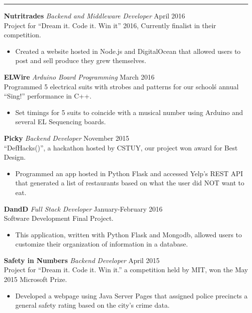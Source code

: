 \documentclass[14, .75in]{article}
\begin{document}
  \vspace{0.1cm} \hrule \vspace{0.2cm}
  \noindent\textbf{Nutritrades}\textit{ Backend and Middleware Developer} \hfill April 2016\\
  Project for ``Dream it. Code it. Win it'' 2016, Currently finalist in their competition.
  \begin{itemize}[label={--},noitemsep, topsep=0pt]
    \item Created a website hosted in Node.js and DigitalOcean that allowed users to post and sell produce they grew themselves.
  \end{itemize}
  \textbf{ELWire}\textit{ Arduino Board Programming} \hfill March 2016\\
  Programmed 5 electrical suits with strobes and patterns for our school\'s annual ``Sing!'' performance in C++.
  \begin{itemize}[label={--},noitemsep, topsep=0pt]
    \item Set timings for 5 suits to coincide with a musical number using Arduino and several EL Sequencing boards.
  \end{itemize}
  \textbf{Picky}\textit{ Backend Developer} \hfill November 2015\\ ``DefHacks()'', a hackathon hosted by CSTUY, our project won award for Best Design.
  \begin{itemize}[label={--},noitemsep, topsep=0pt]
    \item Programmed an app hosted in Python Flask and accessed Yelp's REST API that generated a list of restaurants based on what the user did NOT want to eat.
  \end{itemize}
  \textbf{DandD}\textit{ Full Stack Developer} \hfill January-February 2016\\
  Software Development Final Project.
  \begin{itemize}[label={--},noitemsep, topsep=0pt]
    \item This application, written with Python Flask and Mongodb, allowed users to customize their organization of information in a database.
  \end{itemize}
  \noindent\textbf{Safety in Numbers}\textit{ Backend Developer} \hfill April 2015\\
  Project for ``Dream it. Code it. Win it.'' a competition held by MIT, won the May 2015 Microsoft Prize.
  \begin{itemize}[label={--},noitemsep, topsep=0pt]
    \item Developed a webpage using Java Server Pages that assigned police precincts a general safety rating based on the city's crime data.
  \end{itemize}
\end{document}
